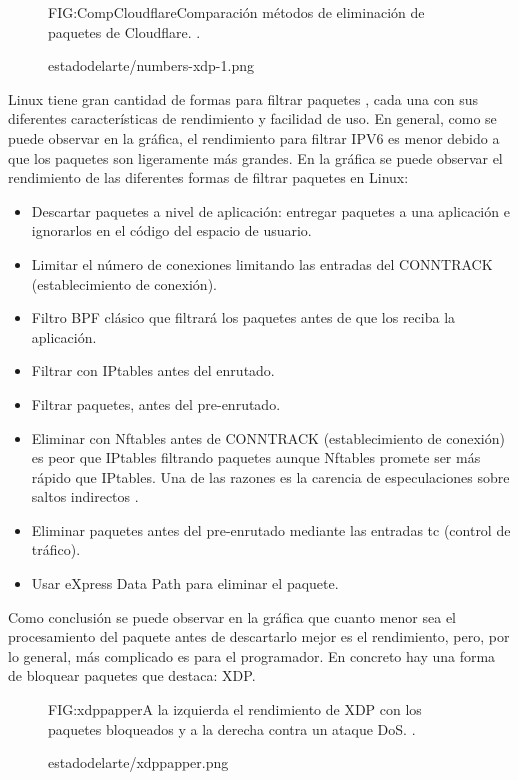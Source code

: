 \begin{figure}[Comparación métodos de eliminación de paquetes.]{FIG:CompCloudflare}{Comparación métodos de eliminación de paquetes de Cloudflare. \cite{CompCloudflare}.}
  \begin{image}{}{}{estadodelarte/numbers-xdp-1.png}
  \end{image}
\end{figure}

Linux tiene gran cantidad de formas para filtrar paquetes \cite{CompCloudflare}, cada una con sus diferentes características de rendimiento y facilidad de uso. En general, como se puede observar en la gráfica, el rendimiento para filtrar IPV6 es menor debido a que los paquetes son ligeramente más grandes. En la gráfica se puede observar el rendimiento de las diferentes formas de filtrar paquetes en Linux:
\begin{itemize}
\item Descartar paquetes a nivel de aplicación: entregar paquetes a una aplicación e ignorarlos en el código del espacio de usuario.
\item Limitar el número de conexiones limitando las entradas del CONNTRACK (establecimiento de conexión).
\item Filtro BPF clásico que filtrará los paquetes antes de que los reciba la aplicación.
\item Filtrar con IPtables antes del enrutado.
\item Filtrar paquetes, antes del pre-enrutado.
\item Eliminar con Nftables antes de CONNTRACK (establecimiento de conexión) es peor que IPtables filtrando paquetes aunque Nftables promete ser más rápido que IPtables. Una de las razones es la carencia de especulaciones sobre saltos indirectos \cite{expnftables}.
\item Eliminar paquetes antes del pre-enrutado mediante las entradas tc (control de tráfico).
\item Usar eXpress Data Path para eliminar el paquete.
\end{itemize}

Como conclusión se puede observar en la gráfica que cuanto menor sea el procesamiento del paquete antes de descartarlo mejor es el rendimiento, pero, por lo general, más complicado es para el programador. En concreto hay una forma de bloquear paquetes que destaca: XDP.

\begin{figure}[Rendimiento de XDP filtrando.]{FIG:xdppapper}{A la izquierda el rendimiento de XDP con los paquetes bloqueados y a la derecha contra un ataque DoS. \cite{xdppapper}.}
  \begin{image}{}{}{estadodelarte/xdppapper.png}
  \end{image}
\end{figure}

